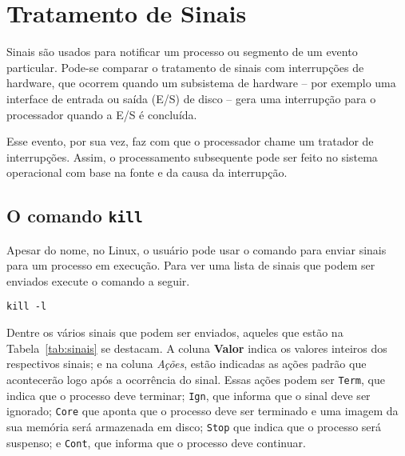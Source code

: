 \chapter{Tratamento de Sinais}

Sinais são usados para notificar um processo ou segmento de um evento particular. Pode-se comparar o tratamento de sinais com interrupções de hardware, que ocorrem quando um subsistema de hardware -- por exemplo uma interface de entrada ou saída (E/S) de disco -- gera uma interrupção para o processador quando a E/S é concluída.

Esse evento, por sua vez, faz com que o processador chame um tratador de interrupções. Assim, o processamento subsequente pode ser feito no sistema operacional com base na fonte e da causa da interrupção.

\section{O comando \texttt{kill}}
Apesar do nome, no Linux, o usuário pode usar o comando  para enviar sinais para um processo em execução. Para ver uma lista de sinais que podem ser enviados execute o comando a seguir.

\begin{lstlisting}[style=MyBashStyle]
kill -l
\end{lstlisting}

Dentre os vários sinais que podem ser enviados, aqueles que estão na Tabela~\ref{tab:sinais} se destacam. A coluna \textbf{Valor} indica os valores inteiros dos respectivos sinais; e na coluna \textit{Ações}, estão indicadas as ações padrão que acontecerão logo após a ocorrência do sinal. Essas ações podem ser \texttt{Term}, que indica que o processo deve terminar; \texttt{Ign}, que informa que o sinal deve ser ignorado; \texttt{Core} que aponta que o processo deve ser terminado e uma imagem da sua memória será armazenada em disco; \texttt{Stop} que indica que o processo será suspenso; e \texttt{Cont}, que informa que o processo deve continuar.

\newpage

